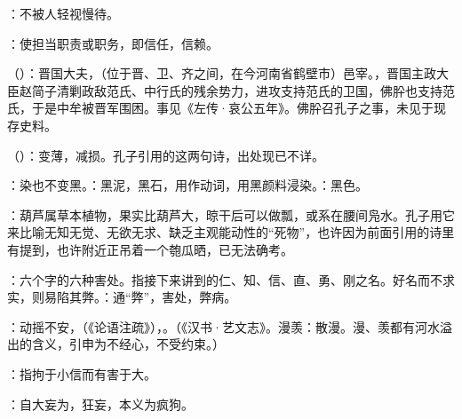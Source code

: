 {
\item {}：不被人轻视慢待。
\item {}：使担当职责或职务，即信任，信赖。
}
{}


{
\item {}（）：晋国大夫，（位于晋、卫、齐之间，在今河南省鹤壁市）邑宰。，晋国主政大臣赵简子清剿政敌范氏、中行氏的残余势力，进攻支持范氏的卫国，佛肸也支持范氏，于是中牟被晋军围困。事见《左传·哀公五年》。佛肸召孔子之事，未见于现存史料。%
\item {}（）：变薄，减损。孔子引用的这两句诗，出处现已不详。

：染也不变黑。：黑泥，黑石，用作动词，用黑颜料浸染。：黑色。

\item {}：葫芦属草本植物，果实比葫芦大，晾干后可以做瓢，或系在腰间凫水。孔子用它来比喻无知无觉、无欲无求、缺乏主观能动性的“死物”，也许因为前面引用的诗里有提到，也许附近正吊着一个匏瓜晒，已无法确考。
}
{}


{
\item {}：六个字的六种害处。指接下来讲到的仁、知、信、直、勇、刚之名。好名而不求实，则易陷其弊。：通“弊”，害处，弊病。
\item {}：动摇不安，（《论语注疏》），。（《汉书·艺文志》。漫羡：散漫。漫、羡都有河水溢出的含义，引申为不经心，不受约束。）
\item {}：指拘于小信而有害于大。
\item {}：自大妄为，狂妄，本义为疯狗。
}
{}  %


